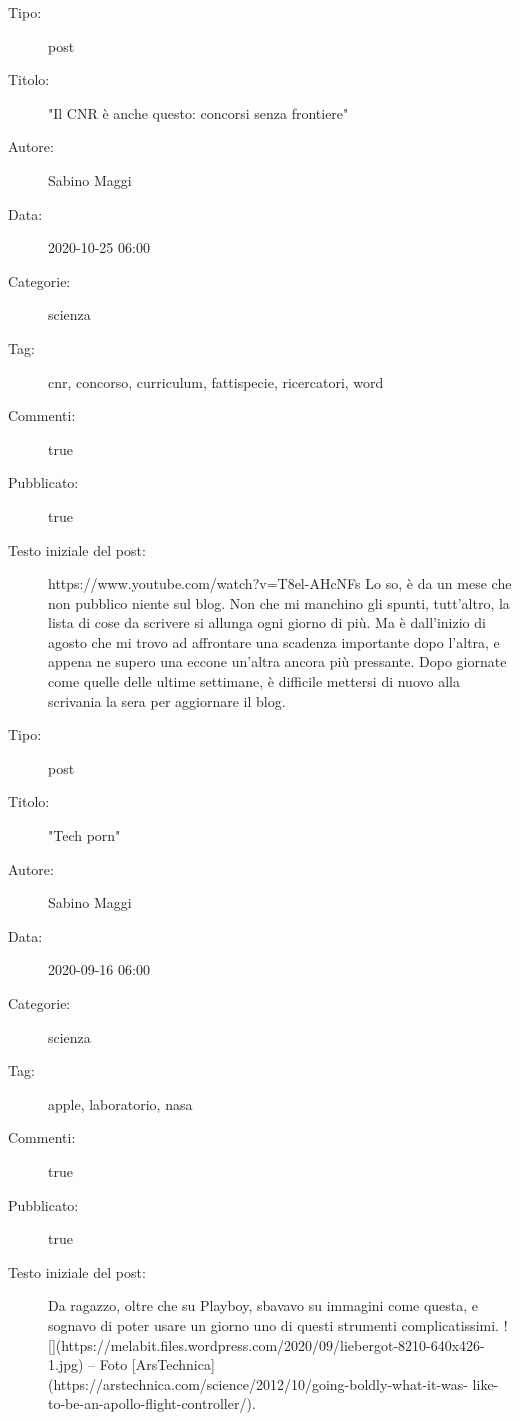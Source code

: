 \documentclass[11pt,oneside,a4paper]{report}
\begin{document}
\begin{framed}
\begin{description}
    \item[Tipo:] post
    \item[Titolo:] "Il CNR è anche questo: concorsi senza frontiere"
    \item[Autore:] Sabino Maggi
    \item[Data:] 2020-10-25 06:00
    \item[Categorie:] scienza
    \item[Tag:] cnr, concorso, curriculum, fattispecie, ricercatori, word
    \item[Commenti:] true
    \item[Pubblicato:] true
    \item[Testo iniziale del post:] 
    https://www.youtube.com/watch?v=T8el-AHcNFs
    Lo so, è da un mese che non pubblico niente sul blog. Non che mi manchino gli spunti,
    tutt'altro, la lista di cose da scrivere si allunga ogni giorno di più. Ma è dall'inizio di agosto
    che mi trovo ad affrontare una scadenza importante dopo l'altra, e appena ne supero una
    eccone un'altra ancora più pressante. Dopo giornate come quelle delle ultime settimane, è
    difficile mettersi di nuovo alla scrivania la sera per aggiornare il blog.
\end{description}
\end{framed}

\begin{framed}
\begin{description}
    \item[Tipo:] post
    \item[Titolo:] "Tech porn"
    \item[Autore:] Sabino Maggi
    \item[Data:] 2020-09-16 06:00
    \item[Categorie:] scienza
    \item[Tag:] apple, laboratorio, nasa
    \item[Commenti:] true
    \item[Pubblicato:] true
    \item[Testo iniziale del post:] 
    Da ragazzo, oltre che su Playboy, sbavavo su immagini come questa, e sognavo di poter
    usare un giorno uno di questi strumenti complicatissimi.
    ![](https://melabit.files.wordpress.com/2020/09/liebergot-8210-640x426-1.jpg)
    -- Foto [ArsTechnica](https://arstechnica.com/science/2012/10/going-boldly-what-it-was-
    like-to-be-an-apollo-flight-controller/).
\end{description}
\end{framed}
\end{document}
